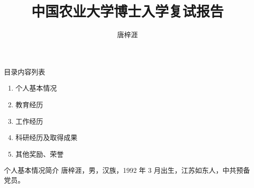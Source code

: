\documentclass[xcolor=svgnames, t, aspectratio=169]{ctexbeamer}
\title{中国农业大学博士入学复试报告}
\date[2022/4/24]{\zhdate{2022/4/24}}
\author[唐梓涯]
{唐梓涯}
\institute
{
  \ciee
  
}
\begin{document}
{\taruwavesbg%
\begin{frame}
  \titlepage
\end{frame}
}

\begin{frame}{目录}{内容列表}
  \begin{enumerate}
    \item 个人基本情况
    \item 教育经历
    \item 工作经历
    \item 科研经历及取得成果
    \item 其他奖励、荣誉
  \end{enumerate}
\end{frame}

\begin{frame}{个人基本情况}{简介}
  唐梓涯，男，汉族，1992 年 3 月出生，江苏如东人，中共预备党员。
\end{frame}
\end{document}
